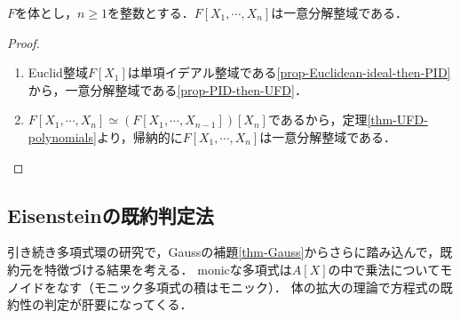 \documentclass[uplatex,dvipdfmx]{jsreport}
\begin{document}
\begin{corollary}
    $F$を体とし，$n\ge 1$を整数とする．$F[X_1,\cdots,X_n]$は一意分解整域である．
\end{corollary}
\begin{proof}\mbox{}
    \begin{enumerate}
        \item Euclid整域$F[X_1]$は単項イデアル整域である\ref{prop-Euclidean-ideal-then-PID}から，一意分解整域である\ref{prop-PID-then-UFD}．
        \item $F[X_1,\cdots,X_n]\simeq(F[X_1,\cdots,X_{n-1}])[X_n]$であるから，定理\ref{thm-UFD-polynomials}より，帰納的に$F[X_1,\cdots,X_n]$は一意分解整域である．
    \end{enumerate}
\end{proof}

\subsection{Eisensteinの既約判定法}

\begin{tcolorbox}[colframe=ForestGreen, colback=ForestGreen!10!white,breakable,colbacktitle=ForestGreen!40!white,coltitle=black,fonttitle=\bfseries\sffamily,
title=]
    引き続き多項式環の研究で，Gaussの補題\ref{thm-Gauss}からさらに踏み込んで，既約元を特徴づける結果を考える．
    monicな多項式は$A[X]$の中で乗法についてモノイドをなす（モニック多項式の積はモニック）．
    体の拡大の理論で方程式の既約性の判定が肝要になってくる．
\end{tcolorbox}
\end{document}
